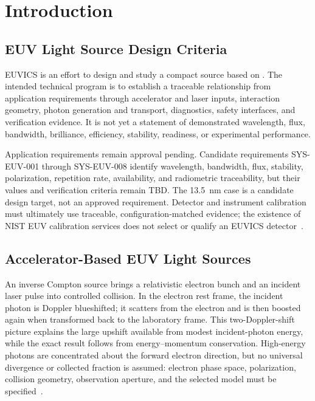 \section{Introduction}

\subsection{EUV Light Source Design Criteria}

EUVICS is an effort to design and study a compact \EUV{} source based on
\ICS{}. The intended technical program is to establish a traceable relationship
from application requirements through accelerator and laser inputs, interaction
geometry, photon generation and transport, diagnostics, safety interfaces, and
verification evidence. It is not yet a statement of demonstrated wavelength,
flux, bandwidth, brilliance, efficiency, stability, readiness, or experimental
performance.

Application requirements remain approval pending. Candidate requirements
SYS-EUV-001 through SYS-EUV-008 identify wavelength, bandwidth, flux, stability,
polarization, repetition rate, availability, and radiometric traceability, but
their values and verification criteria remain TBD. The 13.5~nm case is a
candidate design target, not an approved requirement. Detector and instrument
calibration must ultimately use traceable, configuration-matched evidence; the
existence of NIST EUV calibration services does not select or qualify an EUVICS
detector~\cite{NISTEUVDetectorCalibration}.

\subsection{Accelerator-Based EUV Light Sources}

An inverse Compton source brings a relativistic electron bunch and an incident
laser pulse into controlled collision. In the electron rest frame, the incident
photon is Doppler blueshifted; it scatters from the electron and is then boosted
again when transformed back to the laboratory frame. This two-Doppler-shift
picture explains the large upshift available from modest incident-photon energy,
while the exact result follows from energy--momentum conservation. High-energy
photons are concentrated about the forward electron direction, but no universal
divergence or collected fraction is assumed: electron phase space,
polarization, collision geometry, observation aperture, and the selected model
must be specified~\cite{SunWu2011ComptonSource}.

